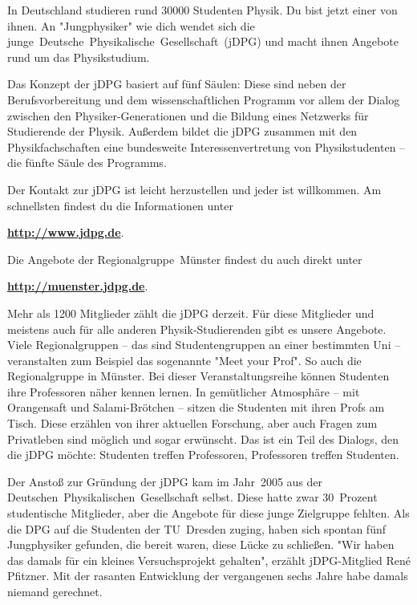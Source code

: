 \begin{multicols}{2}
In Deutschland studieren rund \num{30000} Studenten Physik. Du bist jetzt einer von ihnen. An "Jungphysiker" wie dich wendet sich die junge~Deutsche~Physikalische~Gesellschaft~(jDPG) und macht ihnen Angebote rund um das Physikstudium.

Das Konzept der jDPG basiert auf fünf Säulen: Diese sind neben der Berufsvorbereitung und dem wissenschaftlichen Programm vor allem der Dialog zwischen den Physiker-Generationen und die Bildung eines Netzwerks für Studierende der Physik. Außerdem bildet die jDPG zusammen mit den Physikfachschaften eine bundesweite Interessenvertretung von Physikstudenten -- die fünfte Säule des Programms.

Der Kontakt zur jDPG ist leicht herzustellen und jeder ist willkommen. Am schnellsten findest du die Informationen unter

\begin{center}
\textbf{\url{http://www.jdpg.de}}.
\end{center}

Die Angebote der Regionalgruppe~Münster findest du auch direkt unter

\begin{center}
\textbf{\url{http://muenster.jdpg.de}}.
\end{center}

Mehr als \num{1200} Mitglieder zählt die jDPG derzeit. Für diese Mitglieder und meistens auch für alle anderen Physik-Studierenden gibt es unsere Angebote. Viele Regionalgruppen -- das sind Studentengruppen an einer bestimmten Uni -- veranstalten zum Beispiel das sogenannte "Meet your Prof". So auch die Regionalgruppe in Münster. Bei dieser Veranstaltungsreihe können Studenten ihre Professoren näher kennen lernen. In gemütlicher Atmosphäre -- mit Orangensaft und Salami-Brötchen -- sitzen die Studenten mit ihren Profs am Tisch. Diese erzählen von ihrer aktuellen Forschung, aber auch Fragen zum Privatleben sind möglich und sogar erwünscht. Das ist ein Teil des Dialogs, den die jDPG möchte: Studenten treffen Professoren, Professoren treffen Studenten.

Der Anstoß zur Gründung der jDPG kam im Jahr~2005 aus der Deutschen~Physikalischen~Gesellschaft selbst. Diese hatte zwar 30~Prozent studentische Mitglieder, aber die Angebote für diese junge Zielgruppe fehlten. Als die DPG auf die Studenten der TU~Dresden zuging, haben sich spontan fünf Jungphysiker gefunden, die bereit waren, diese Lücke zu schließen. "Wir haben das damals für ein kleines Versuchsprojekt gehalten", erzählt jDPG-Mitglied René Pfitzner. Mit der rasanten Entwicklung der vergangenen sechs Jahre habe damals niemand gerechnet.


\end{multicols}
